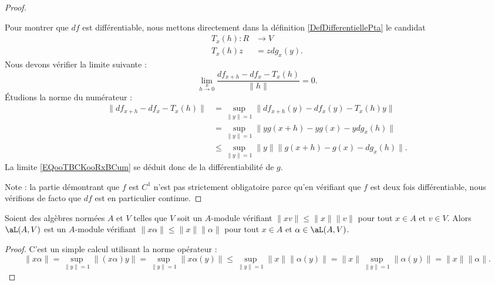 \begin{proof}
\begin{subproof}
            Pour montrer que \( df\) est différentiable, nous mettons directement dans la définition \eqref{DefDifferentiellePta} le candidat
            \begin{equation}
                \begin{aligned}
                    T_x(h)\colon R&\to V \\
                    T_x(h)z&=zdg_x(y).
                \end{aligned}
            \end{equation}
            Nous devons vérifier la limite suivante :
            \begin{equation}        \label{EQooTBCKooRxBCum}
                \lim_{h\stackrel{E}{\longrightarrow} 0} \frac{ df_{x+h}-df_x-T_x(h) }{ \| h \| }=0.
            \end{equation}
            Étudions la norme du numérateur :
            \begin{subequations}
                \begin{align}
                    \| df_{x+h}-df_x-T_x(h) \|&=\sup_{\| y \|=1}\| df_{x+h}(y)-df_x(y)-T_x(h)y \|\\
                    &=\sup_{\| y \|=1}\| yg(x+h)-yg(x)-ydg_x(h) \|\\
                    &\leq \sup_{\| y \|=1}\| y \| \| g(x+h)-g(x)-dg_x(h) \|.
                \end{align}
            \end{subequations}
            La limite \eqref{EQooTBCKooRxBCum} se déduit donc de la différentiabilité de \( g\).
    \end{subproof}
    Note : la partie démontrant que \( f\) est \( C^1\) n'est pas strictement obligatoire parce qu'en vérifiant que \( f\) est deux fois différentiable, nous vérifions de facto que \( df\) est en particulier continue.
\end{proof}

\begin{lemma}   \label{LEMooTUWQooMCCDcm}
    Soient des algèbres normées \( A\) et \( V\) telles que \( V\) soit un \( A\)-module vérifiant \( \| xv \|\leq \| x \|\| v \|\) pour tout \( x\in A\) et \( v\in V\). Alors \( \aL(A,V)\) est un \( A\)-module vérifiant \( \| x\alpha \|\leq \| x \|\|\alpha  \|\) pour tout \( x\in A\) et \( \alpha\in \aL(A,V)\).
\end{lemma}

\begin{proof}
    C'est un simple calcul utilisant la norme opérateur :
    \begin{equation}
            \| x\alpha \|=\sup_{\| y \|=1}\| (x\alpha)y \|
            =\sup_{\| y \|=1}\| x\alpha(y) \|
            \leq \sup_{\| y \|=1}\| x \|\| \alpha(y) \|
            =\| x \|\sup_{\| y \|=1}\| \alpha(y) \|
            =\| x \|\| \alpha \|.
    \end{equation}
\end{proof}

